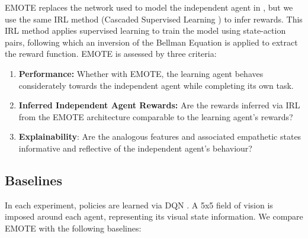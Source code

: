 EMOTE replaces the network used to model the independent agent in \cite{SympathyPaper}, but we use the same IRL method (Cascaded Supervised Learning \cite{cascadedSuperIRL2013}) to infer rewards. This IRL method applies supervised learning to train the model using state-action pairs, following which an inversion of the Bellman Equation is applied to extract the reward function. EMOTE is assessed by three criteria:


\begin{enumerate}
    \item \textbf{Performance:} Whether with EMOTE, the learning agent behaves considerately towards the independent agent while completing its own task.
    \item \textbf{Inferred Independent Agent Rewards:} Are the rewards inferred via IRL from the EMOTE architecture comparable to the learning agent's rewards?%
    \item \textbf{Explainability}: Are the analogous features and associated empathetic states informative and reflective of the independent agent's behaviour?
\end{enumerate}



\subsection{Baselines}
In each experiment, policies are learned via DQN \cite{mnih2015human}. A 5x5 field of vision is imposed around each agent, representing its visual state information. We compare EMOTE with the following baselines:

